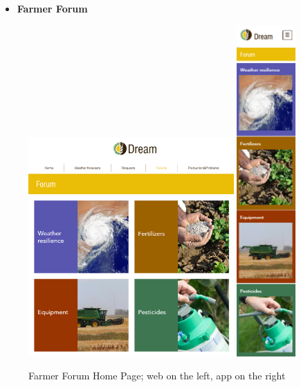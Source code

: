 \documentclass{article}
\begin{document}
    \begin{itemize}
        \item \textbf{Farmer Forum}
    \end{itemize}
        \begin{figure} [h]
            \centering
            \includegraphics[width=0.7\textwidth]{images/UserInterfaces/Farmer/Forum/ForumHomePageWeb.png}
            \quad
            \includegraphics[width=0.2\textwidth]{images/UserInterfaces/Farmer/Forum/ForumHomePageApp.png}
            \quad
            \caption{\label{fig:farmerForumHomePage}Farmer Forum Home Page; web on the left, app on the right}
        \end{figure}
\end{document}
